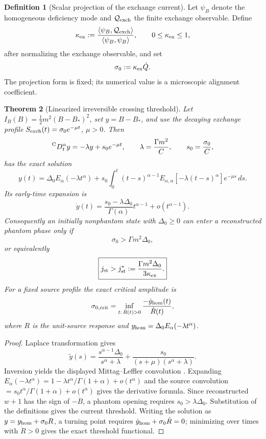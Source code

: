 \documentclass[11pt]{article}
\newtheorem{theorem}{Theorem}[section]
\theoremstyle{definition}
\newtheorem{definition}[theorem]{Definition}
\theoremstyle{remark}
\begin{document}
\begin{definition}[Scalar projection of the exchange current]
\label{def:exchange-projection}
Let \(\psi_B\) denote the homogeneous deficiency mode and
\(\mathcal Q_{\rm exch}\) the finite exchange observable.  Define
\[
 \kappa_{\rm ex}:=
 \frac{\langle\psi_B,\mathcal Q_{\rm exch}\rangle}
      {\langle\psi_B,\psi_B\rangle},
 \qquad 0\le\kappa_{\rm ex}\le1,
\]
after normalizing the exchange observable, and set
\[
  \sigma_0:=\kappa_{\rm ex}\dot Q.
\]
The projection form is fixed; its numerical value is a microscopic alignment
coefficient.
\end{definition}

\begin{theorem}[Linearized irreversible crossing threshold]
\label{thm:irreversible-crossing-threshold}
Let \(I_B(B)=\tfrac12m^2(B-B_*)^2\), set
\(y=B-B_*\), and use the decaying exchange profile
\(S_{\rm exch}(t)=\sigma_0e^{-\mu t}\), \(\mu>0\).  Then
\[
 \prescript{\mathrm C}{}{D}_t^\alpha y
 =-\lambda y+s_0e^{-\mu t},
 \qquad
 \lambda=\frac{\Gamma m^2}{C},
 \qquad
 s_0=\frac{\sigma_0}{C},
\]
has the exact solution
\[
 y(t)=\Delta_0E_\alpha(-\lambda t^\alpha)
 +s_0\int_0^t(t-s)^{\alpha-1}
 E_{\alpha,\alpha}[-\lambda(t-s)^\alpha]e^{-\mu s}\,ds.
\]
Its early-time expansion is
\[
  \dot y(t)=
  \frac{s_0-\lambda\Delta_0}{\Gamma(\alpha)}t^{\alpha-1}
  +o(t^{\alpha-1}).
\]
Consequently an initially nonphantom state with \(\Delta_0\ge0\) can enter a
reconstructed phantom phase only if
\[
 \boxed{
 \sigma_0>\Gamma m^2\Delta_0,}
\]
or equivalently
\[
 \boxed{
 j_{\rm st}>j_{\rm st}^{*}
 :=\frac{\Gamma m^2\Delta_0}{3\kappa_{\rm ex}}.}
\]
For a fixed source profile the exact critical amplitude is
\[
  \sigma_{0,{\rm crit}}
  =\inf_{t:\,\dot R(t)>0}
    \frac{-\dot y_{\rm hom}(t)}{\dot R(t)},
\]
where \(R\) is the unit-source response and
\(y_{\rm hom}=\Delta_0E_\alpha(-\lambda t^\alpha)\).
\end{theorem}

\begin{proof}
Laplace transformation gives
\[
 \widetilde y(s)
 =\frac{s^{\alpha-1}\Delta_0}{s^\alpha+\lambda}
 +\frac{s_0}{(s+\mu)(s^\alpha+\lambda)}.
\]
Inversion yields the displayed Mittag--Leffler convolution
\cite{Podlubny,MetzlerKlafter}.  Expanding
\(E_\alpha(-\lambda t^\alpha)
 =1-\lambda t^\alpha/\Gamma(1+\alpha)+o(t^\alpha)\)
and the source convolution
\(=s_0t^\alpha/\Gamma(1+\alpha)+o(t^\alpha)\) gives the derivative formula.
Since reconstructed \(w+1\) has the sign of \(-\dot B\), a phantom opening
requires \(s_0>\lambda\Delta_0\).  Substitution of the definitions gives the
current threshold.  Writing the solution as
\(y=y_{\rm hom}+\sigma_0R\), a turning point requires
\(\dot y_{\rm hom}+\sigma_0\dot R=0\); minimizing over times with
\(\dot R>0\) gives the exact threshold functional.
\end{proof}
\end{document}
